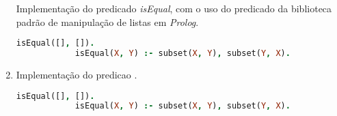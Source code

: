 \documentclass{article}
\begin{document}
\begin{enumerate}
        Implementação do predicado \textit{isEqual}, com o uso do predicado da biblioteca padrão de manipulação
        de listas em \textit{Prolog}.

        \begin{lstlisting}[language=Prolog]
            isEqual([], []).
            isEqual(X, Y) :- subset(X, Y), subset(Y, X).
        \end{lstlisting}

    \item 

        Implementação do predicao .

        \begin{lstlisting}[language=Prolog]
            isEqual([], []).
            isEqual(X, Y) :- subset(X, Y), subset(Y, X).
        \end{lstlisting}

\end{enumerate}
    
\end{document}
